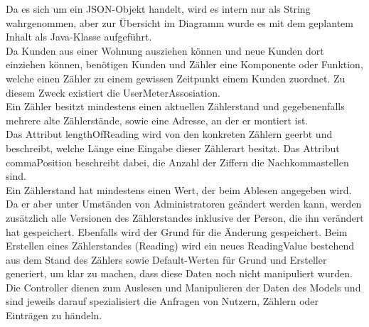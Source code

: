 Da es sich um ein JSON-Objekt handelt, wird es intern nur als String wahrgenommen, aber zur Übersicht im Diagramm wurde es mit dem geplantem Inhalt als Java-Klasse aufgeführt.\\
Da Kunden aus einer Wohnung ausziehen können und neue Kunden dort einziehen können, benötigen Kunden und Zähler eine Komponente oder Funktion, welche einen Zähler zu einem gewissen Zeitpunkt einem Kunden zuordnet. 
Zu diesem Zweck existiert die UserMeterAssosiation.\\
Ein Zähler besitzt mindestens einen aktuellen Zählerstand und gegebenenfalls mehrere alte Zählerstände, sowie eine Adresse, an der er montiert ist.\\
Das Attribut lengthOfReading wird von den konkreten Zählern geerbt und beschreibt, welche Länge eine Eingabe dieser Zählerart besitzt. Das Attribut commaPosition beschreibt dabei, die Anzahl der Ziffern die Nachkommastellen sind.\\
Ein Zählerstand hat mindestens einen Wert, der beim Ablesen angegeben wird. 
Da er aber unter Umständen von Administratoren geändert werden kann, werden zusätzlich alle Versionen des Zählerstandes inklusive der Person, die ihn verändert hat gespeichert. Ebenfalls wird der Grund für die Änderung gespeichert.
Beim Erstellen eines Zählerstandes (Reading) wird ein neues ReadingValue bestehend aus dem Stand des Zählers sowie Default-Werten für Grund und Ersteller generiert, um klar zu machen, dass diese Daten noch nicht manipuliert wurden.\\
Die Controller dienen zum Auslesen und Manipulieren der Daten des Models und sind jeweils darauf spezialisiert die Anfragen von Nutzern, Zählern oder Einträgen zu händeln.

